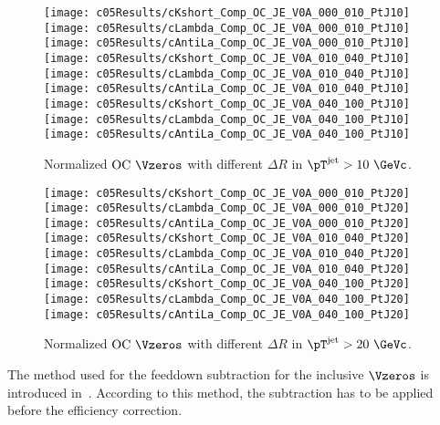 \begin{figure}[htb]
\begin{center}
\texttt{[image: c05Results/cKshort\_Comp\_OC\_JE\_V0A\_000\_010\_PtJ10]}
\texttt{[image: c05Results/cLambda\_Comp\_OC\_JE\_V0A\_000\_010\_PtJ10]}
\texttt{[image: c05Results/cAntiLa\_Comp\_OC\_JE\_V0A\_000\_010\_PtJ10]}
\texttt{[image: c05Results/cKshort\_Comp\_OC\_JE\_V0A\_010\_040\_PtJ10]}
\texttt{[image: c05Results/cLambda\_Comp\_OC\_JE\_V0A\_010\_040\_PtJ10]}
\texttt{[image: c05Results/cAntiLa\_Comp\_OC\_JE\_V0A\_010\_040\_PtJ10]}
\texttt{[image: c05Results/cKshort\_Comp\_OC\_JE\_V0A\_040\_100\_PtJ10]}
\texttt{[image: c05Results/cLambda\_Comp\_OC\_JE\_V0A\_040\_100\_PtJ10]}
\texttt{[image: c05Results/cAntiLa\_Comp\_OC\_JE\_V0A\_040\_100\_PtJ10]}
\caption{Normalized ${\rm OC}~\Vzeros$ with different $\Delta R$ in
         $\pT^{\rm jet}>10~\GeVc$.}
\label{fig:c05RestulsCompOCPtJ10}
\end{center}
\end{figure}

\begin{figure}[htb]
\begin{center}
\texttt{[image: c05Results/cKshort\_Comp\_OC\_JE\_V0A\_000\_010\_PtJ20]}
\texttt{[image: c05Results/cLambda\_Comp\_OC\_JE\_V0A\_000\_010\_PtJ20]}
\texttt{[image: c05Results/cAntiLa\_Comp\_OC\_JE\_V0A\_000\_010\_PtJ20]}
\texttt{[image: c05Results/cKshort\_Comp\_OC\_JE\_V0A\_010\_040\_PtJ20]}
\texttt{[image: c05Results/cLambda\_Comp\_OC\_JE\_V0A\_010\_040\_PtJ20]}
\texttt{[image: c05Results/cAntiLa\_Comp\_OC\_JE\_V0A\_010\_040\_PtJ20]}
\texttt{[image: c05Results/cKshort\_Comp\_OC\_JE\_V0A\_040\_100\_PtJ20]}
\texttt{[image: c05Results/cLambda\_Comp\_OC\_JE\_V0A\_040\_100\_PtJ20]}
\texttt{[image: c05Results/cAntiLa\_Comp\_OC\_JE\_V0A\_040\_100\_PtJ20]}
\caption{Normalized ${\rm OC}~\Vzeros$ with different $\Delta R$
         in $\pT^{\rm jet}>20~\GeVc$.}
\label{fig:c05RestulsCompOCPtJ20}
\end{center}
\end{figure}

The method used for the  feeddown subtraction for the inclusive $\Vzeros$
is introduced in~\cite{Ali2012:ana501}.
According to this method, the subtraction has to be applied before the
efficiency correction.

